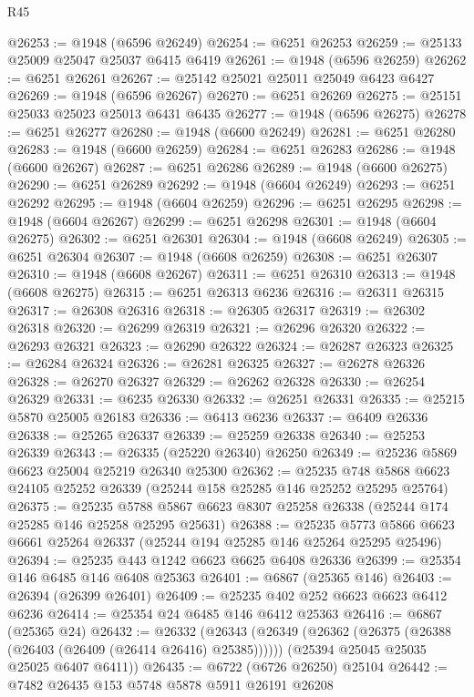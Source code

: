 \begin{lexlean}{R45}
\begin{coremodule}
{@26253 := @1948 (@6596 @26249)
@26254 := @6251 @26253
@26259 := @25133 @25009 @25047 @25037 @6415 @6419
@26261 := @1948 (@6596 @26259)
@26262 := @6251 @26261
@26267 := @25142 @25021 @25011 @25049 @6423 @6427
@26269 := @1948 (@6596 @26267)
@26270 := @6251 @26269
@26275 := @25151 @25033 @25023 @25013 @6431 @6435
@26277 := @1948 (@6596 @26275)
@26278 := @6251 @26277
@26280 := @1948 (@6600 @26249)
@26281 := @6251 @26280
@26283 := @1948 (@6600 @26259)
@26284 := @6251 @26283
@26286 := @1948 (@6600 @26267)
@26287 := @6251 @26286
@26289 := @1948 (@6600 @26275)
@26290 := @6251 @26289
@26292 := @1948 (@6604 @26249)
@26293 := @6251 @26292
@26295 := @1948 (@6604 @26259)
@26296 := @6251 @26295
@26298 := @1948 (@6604 @26267)
@26299 := @6251 @26298
@26301 := @1948 (@6604 @26275)
@26302 := @6251 @26301
@26304 := @1948 (@6608 @26249)
@26305 := @6251 @26304
@26307 := @1948 (@6608 @26259)
@26308 := @6251 @26307
@26310 := @1948 (@6608 @26267)
@26311 := @6251 @26310
@26313 := @1948 (@6608 @26275)
@26315 := @6251 @26313 @6236
@26316 := @26311 @26315
@26317 := @26308 @26316
@26318 := @26305 @26317
@26319 := @26302 @26318
@26320 := @26299 @26319
@26321 := @26296 @26320
@26322 := @26293 @26321
@26323 := @26290 @26322
@26324 := @26287 @26323
@26325 := @26284 @26324
@26326 := @26281 @26325
@26327 := @26278 @26326
@26328 := @26270 @26327
@26329 := @26262 @26328
@26330 := @26254 @26329
@26331 := @6235 @26330
@26332 := @26251 @26331
@26335 := @25215 @5870 @25005 @26183
@26336 := @6413 @6236
@26337 := @6409 @26336
@26338 := @25265 @26337
@26339 := @25259 @26338
@26340 := @25253 @26339
@26343 := @26335 (@25220 @26340) @26250
@26349 := @25236 @5869 @6623 @25004 @25219 @26340 @25300
@26362 := @25235
    @748
    @5868
    @6623
    @24105
    @25252
    @26339
    (@25244 @158 @25285 @146 @25252 @25295 @25764)
@26375 := @25235
    @5788
    @5867
    @6623
    @8307
    @25258
    @26338
    (@25244 @174 @25285 @146 @25258 @25295 @25631)
@26388 := @25235
    @5773
    @5866
    @6623
    @6661
    @25264
    @26337
    (@25244 @194 @25285 @146 @25264 @25295 @25496)
@26394 := @25235 @443 @1242 @6623 @6625 @6408 @26336
@26399 := @25354 @146 @6485 @146 @6408 @25363
@26401 := @6867 (@25365 @146)
@26403 := @26394 (@26399 @26401)
@26409 := @25235 @402 @252 @6623 @6623 @6412 @6236
@26414 := @25354 @24 @6485 @146 @6412 @25363
@26416 := @6867 (@25365 @24)
@26432 := @26332
    (@26343
      (@26349 (@26362 (@26375 (@26388 (@26403 (@26409 (@26414 @26416) @25385))))))
      (@25394 @25045 @25035 @25025 @6407 @6411))
@26435 := @6722 (@6726 @26250) @25104
@26442 := @7482 @26435 @153 @5748 @5878 @5911 @26191 @26208
}
\end{coremodule}
\end{lexlean}
